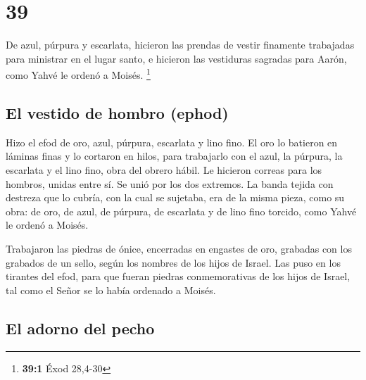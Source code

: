 \hypertarget{section-38}{%
\section{39}\label{section-38}}

 De azul, púrpura y escarlata, hicieron las prendas de
vestir finamente trabajadas para ministrar en el lugar santo, e hicieron
las vestiduras sagradas para Aarón, como Yahvé le ordenó a Moisés.
\footnote{\textbf{39:1} Éxod 28,4-30}

\hypertarget{el-vestido-de-hombro-ephod-1}{%
\subsection{El vestido de hombro
(ephod)}\label{el-vestido-de-hombro-ephod-1}}

 Hizo el efod de oro, azul, púrpura, escarlata y lino
fino.  El oro lo batieron en láminas finas y lo cortaron
en hilos, para trabajarlo con el azul, la púrpura, la escarlata y el
lino fino, obra del obrero hábil.  Le hicieron correas
para los hombros, unidas entre sí. Se unió por los dos extremos.
 La banda tejida con destreza que lo cubría, con la cual
se sujetaba, era de la misma pieza, como su obra: de oro, de azul, de
púrpura, de escarlata y de lino fino torcido, como Yahvé le ordenó a
Moisés.

 Trabajaron las piedras de ónice, encerradas en engastes
de oro, grabadas con los grabados de un sello, según los nombres de los
hijos de Israel.  Las puso en los tirantes del efod, para
que fueran piedras conmemorativas de los hijos de Israel, tal como el
Señor se lo había ordenado a Moisés.

\hypertarget{el-adorno-del-pecho}{%
\subsection{El adorno del pecho}\label{el-adorno-del-pecho}}


